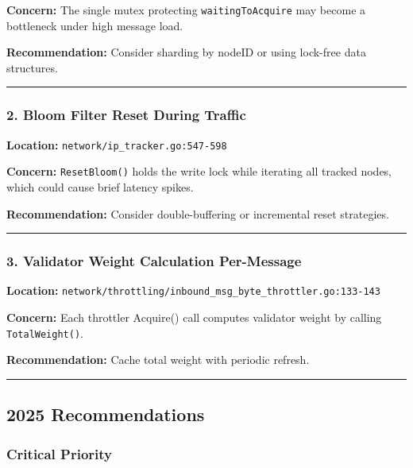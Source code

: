 \documentclass[
]{article}
\begin{document}
\textbf{Concern:} The single mutex protecting \texttt{waitingToAcquire}
may become a bottleneck under high message load.

\textbf{Recommendation:} Consider sharding by nodeID or using lock-free
data structures.

\begin{center}\rule{0.5\linewidth}{0.5pt}\end{center}

\subsubsection{2. Bloom Filter Reset During
Traffic}\label{2-bloom-filter-reset-during-traffic}

\textbf{Location:} \texttt{network/ip\_tracker.go:547-598}

\textbf{Concern:} \texttt{ResetBloom()} holds the write lock while
iterating all tracked nodes, which could cause brief latency spikes.

\textbf{Recommendation:} Consider double-buffering or incremental reset
strategies.

\begin{center}\rule{0.5\linewidth}{0.5pt}\end{center}

\subsubsection{3. Validator Weight Calculation
Per-Message}\label{3-validator-weight-calculation-per-message}

\textbf{Location:}
\texttt{network/throttling/inbound\_msg\_byte\_throttler.go:133-143}

\textbf{Concern:} Each throttler Acquire() call computes validator
weight by calling \texttt{TotalWeight()}.

\textbf{Recommendation:} Cache total weight with periodic refresh.

\begin{center}\rule{0.5\linewidth}{0.5pt}\end{center}

\subsection{2025 Recommendations}\label{2025-recommendations}

\subsubsection{Critical Priority}\label{critical-priority}
\end{document}
